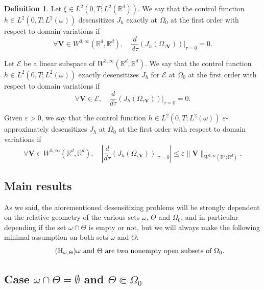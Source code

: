 \documentclass[10pt,a4paper]{amsart}
\newcommand{\bV}{\boldsymbol{V}}
\newcommand\R{{\mathbb R}}
\newcommand{\Hreg}{\mathrm{H}_{\omega,\Theta}}
\theoremstyle{definition}
\newtheorem{definition}[theorem]{Definition}
\begin{document}
\begin{definition}
Let {$\xi \in L^2(0,T; L^2(\R^d))$}.
We say that the control function $h \in L^2(0,T; L^2(\omega))$ desensitizes $J_h$ exactly at $\Omega_0$ at the first order with respect to domain variations if
\begin{equation}
\label{Exact-Insentitizing}
\forall\bV\in W^{3,\infty}(\R^d, \R^d),
\quad
\dfrac{d }{d \tau}\left(J_h \left(\Omega_{\tau\bV} \right)\right)\Big|_{\tau=0}=0.
\end{equation}

Let $\mathcal{E}$ be a linear subspace of $W^{3,\infty}(\R^d, \R^d)$.
We say that the control function $h \in L^2(0,T; L^2(\omega))$ exactly desensitizes $J_h$ for $\mathcal{E}$ at $\Omega_0$ at the first order with respect to domain variations if
\begin{equation}
\label{Finite-Insensitizing}
\forall\bV\in \mathcal{E},
\quad
\dfrac{d }{d \tau}\left(J_h \left(\Omega_{\tau\bV} \right)\right)\Big|_{\tau=0}=0.
\end{equation}

Given $\varepsilon>0$, we say that the control function $h \in L^2(0,T; L^2(\omega))$ $\varepsilon$-approximately desensitizes $J_h$ at $\Omega_0$ at the first order with respect to domain variations if
\begin{equation}
\label{Approx-Insensitizing}
\forall\bV\in W^{3,\infty}(\R^d, \R^d),
\quad
\left|\dfrac{d }{d \tau}\left(J_h\left(\Omega_{\tau \bV}\right)\right)\Big|_{\tau=0}\right |\leq \varepsilon \| \bV \|_{W^{3, \infty}(\R^d; \R^d)}.
\end{equation}
\end{definition}

\subsection{Main results}
As we said, the aforementioned desensitizing problems will be strongly dependent on the relative geometry of the various sets $\omega$, $\Theta$ and $\Omega_0$, and in particular depending if the set $\omega \cap \Theta$ is empty or not{, but we will always make the following minimal assumption} on both sets $\omega$ and $\Theta$:
\begin{equation}\tag{$\Hreg$}\label{regMinOmThe}
\text{$\omega$ and $\Theta$ are two nonempty open subsets of $\Omega_0$.}
\end{equation}

\subsection*{Case \texorpdfstring{$\omega \cap \Theta = \emptyset$ and $\Theta \Subset \Omega_0$}{caseo}}
\end{document}
